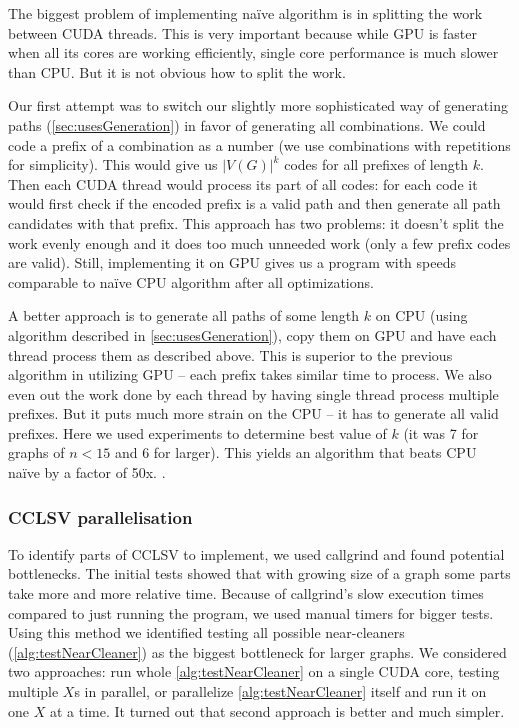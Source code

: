 The biggest problem of implementing na\"ive algorithm is in splitting the work between CUDA threads. This is very important because while GPU is faster when all its cores are working efficiently, single core performance is much slower than CPU. But it is not obvious how to split the work.

Our first attempt was to switch our slightly more sophisticated way of generating paths (\cref{sec:usesGeneration}) in favor of generating all combinations. We could code a prefix of a combination as a number (we use combinations with repetitions for simplicity). This would give us $|V(G)|^k$ codes for all prefixes of length $k$. Then each CUDA thread would process its part of all codes: for each code it would first check if the encoded prefix is a valid path and then generate all path candidates with that prefix. This approach has two problems: it doesn't split the work evenly enough and it does too much unneeded work (only a few prefix codes are valid). Still, implementing it on GPU gives us a program with speeds comparable to na\"ive CPU algorithm after all optimizations.

A better approach is to generate all paths of some length $k$ on CPU (using algorithm described in \cref{sec:usesGeneration}), copy them on GPU and have each thread process them as described above. This is superior to the previous algorithm in utilizing GPU -- each prefix takes similar time to process. We also even out the work done by each thread by having single thread process multiple prefixes. But it puts much more strain on the CPU -- it has to generate all valid prefixes. Here we used experiments to determine best value of $k$ (it was 7 for graphs of $n < 15$  and 6 for larger). This yields an algorithm that beats CPU na\"ive by a factor of 50x. .

\subsubsection{CCLSV parallelisation}

To identify parts of CCLSV to implement, we used callgrind and found potential bottlenecks. The initial tests showed that with growing size of a graph some parts take more and more relative time. Because of callgrind's slow execution times compared to just running the program, we used manual timers for bigger tests. Using this method we identified testing all possible near-cleaners (\cref{alg:testNearCleaner}) as the biggest bottleneck for larger graphs. We considered two approaches: run whole \cref{alg:testNearCleaner} on a single CUDA core, testing multiple $X$s in parallel, or parallelize \cref{alg:testNearCleaner} itself and run it on one $X$ at a time. It turned out that second approach is better and much simpler.

